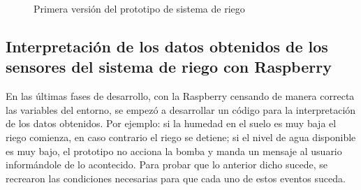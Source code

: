 \begin{figure}[H]
	\begin{center}
	\end{center}
	\label{todo}
	\caption{Primera versi\'on del prototipo de sistema de riego}
\end{figure} 


\subsection{Interpretaci\'{o}n de los datos obtenidos de los sensores del sistema de riego con Raspberry}
En las \'ultimas fases de desarrollo, con la Raspberry censando de manera correcta las variables del entorno, se empez\'o a desarrollar un c\'odigo para la interpretaci\'on de los datos obtenidos. Por ejemplo: si la humedad en el suelo es muy baja el riego comienza, en caso contrario el riego se detiene; si el nivel de agua disponible es muy bajo, el prototipo no acciona la bomba y manda un mensaje al usuario inform\'andole de lo acontecido. Para probar que lo anterior dicho sucede, se recrearon las condiciones necesarias para que cada uno de estos eventos suceda.

